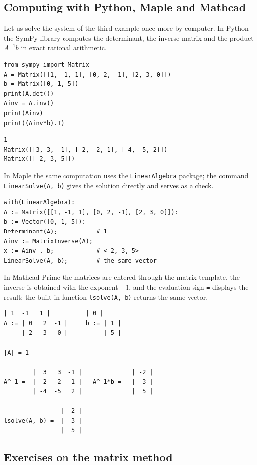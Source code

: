 \subsection{Computing with Python, Maple and Mathcad}

Let us solve the system of the third example once more by computer. In
Python the SymPy library computes the determinant, the inverse matrix and
the product $A^{-1}b$ in exact rational arithmetic.
\begin{Verbatim}[fontsize=\footnotesize,frame=single,label={\small Python}]
from sympy import Matrix
A = Matrix([[1, -1, 1], [0, 2, -1], [2, 3, 0]])
b = Matrix([0, 1, 5])
print(A.det())
Ainv = A.inv()
print(Ainv)
print((Ainv*b).T)
\end{Verbatim}
\begin{Verbatim}[fontsize=\footnotesize,frame=single,label={\small Output}]
1
Matrix([[3, 3, -1], [-2, -2, 1], [-4, -5, 2]])
Matrix([[-2, 3, 5]])
\end{Verbatim}

In Maple the same computation uses the \texttt{LinearAlgebra} package; the
command \texttt{LinearSolve(A, b)} gives the solution directly and serves as
a check.
\begin{Verbatim}[fontsize=\footnotesize,frame=single,label={\small Maple}]
with(LinearAlgebra):
A := Matrix([[1, -1, 1], [0, 2, -1], [2, 3, 0]]):
b := Vector([0, 1, 5]):
Determinant(A);           # 1
Ainv := MatrixInverse(A);
x := Ainv . b;            # <-2, 3, 5>
LinearSolve(A, b);        # the same vector
\end{Verbatim}

In Mathcad Prime the matrices are entered through the matrix template, the
inverse is obtained with the exponent $-1$, and the evaluation sign
\texttt{=} displays the result; the built-in function \texttt{lsolve(A, b)}
returns the same vector.
\begin{Verbatim}[fontsize=\footnotesize,frame=single,label={\small Mathcad}]
     | 1  -1   1 |          | 0 |
A := | 0   2  -1 |     b := | 1 |
     | 2   3   0 |          | 5 |

|A| = 1

        |  3   3  -1 |              | -2 |
A^-1 =  | -2  -2   1 |   A^-1*b =   |  3 |
        | -4  -5   2 |              |  5 |

                | -2 |
lsolve(A, b) =  |  3 |
                |  5 |
\end{Verbatim}

\subsection{Exercises on the matrix method}
\bigskip


